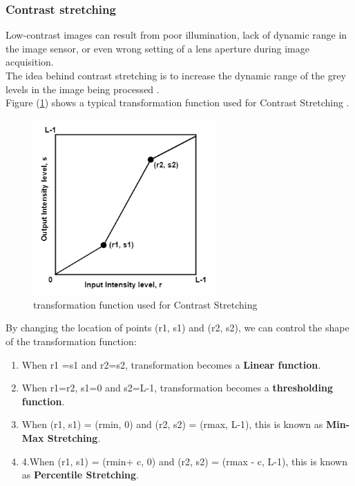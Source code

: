 \subsubsection{Contrast stretching}
Low-contrast images can result from poor illumination, lack of dynamic range in the image sensor,
or even wrong setting of a lens aperture during image acquisition.\\
The idea behind contrast stretching is to increase the dynamic range of the grey levels in the image being processed \cite{1.10}.\\
Figure (\ref{fig:figure1.9}) shows a typical transformation function used for Contrast Stretching \cite{1.11}.

        \begin{figure}[h]
                \centering
                \includegraphics[width=7cm]{chapiter1/figures/linear_Transform.png}
                \setlength{\fboxrule}{2pt}
                \caption{transformation function used for Contrast Stretching \cite{1.11}}
                \label{fig:figure1.9}
        \end{figure}

\hspace{-0.6cm}By changing the location of points (r1, s1) and (r2, s2), we can control the shape of the transformation function:
        \begin{enumerate}
                \item When r1 =s1 and r2=s2, transformation becomes a \textbf{Linear function}.
                \item When r1=r2, s1=0 and s2=L-1, transformation becomes a \textbf{thresholding function}.
                \item When (r1, s1) = (rmin, 0) and (r2, s2) = (rmax, L-1), this is known as \textbf{Min-Max Stretching}.
                \item 4.When (r1, s1) = (rmin+ c, 0) and (r2, s2) = (rmax - c, L-1), this is known as \textbf{Percentile Stretching}.
        \end{enumerate}

